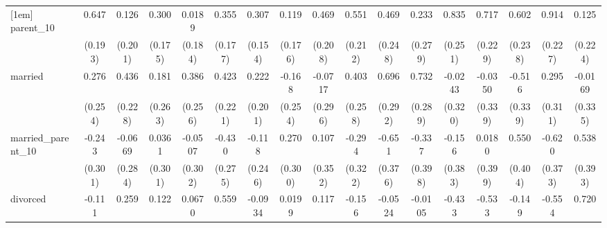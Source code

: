 {\begin{tabular}{l*{16}{c}}
[1em]
parent\_10           &       0.647\sym{***}&       0.126         &       0.300         &      0.0189         &       0.355\sym{*}  &       0.307\sym{*}  &       0.119         &       0.469\sym{*}  &       0.551\sym{**} &       0.469         &       0.233         &       0.835\sym{***}&       0.717\sym{**} &       0.602\sym{*}  &       0.914\sym{***}&       0.125         \\
                    &     (0.193)         &     (0.201)         &     (0.175)         &     (0.184)         &     (0.177)         &     (0.154)         &     (0.176)         &     (0.208)         &     (0.212)         &     (0.248)         &     (0.279)         &     (0.251)         &     (0.229)         &     (0.238)         &     (0.227)         &     (0.224)         \\
[1em]
married             &       0.276         &       0.436         &       0.181         &       0.386         &       0.423         &       0.222         &      -0.168         &     -0.0717         &       0.403         &       0.696\sym{*}  &       0.732\sym{*}  &     -0.0243         &     -0.0350         &      -0.516         &       0.295         &     -0.0169         \\
                    &     (0.254)         &     (0.228)         &     (0.263)         &     (0.256)         &     (0.221)         &     (0.201)         &     (0.254)         &     (0.296)         &     (0.258)         &     (0.292)         &     (0.289)         &     (0.320)         &     (0.339)         &     (0.339)         &     (0.311)         &     (0.335)         \\
[1em]
married\_parent\_10   &      -0.243         &     -0.0669         &      0.0361         &     -0.0507         &      -0.430         &      -0.118         &       0.270         &       0.107         &      -0.294         &      -0.651         &      -0.337         &      -0.156         &      0.0180         &       0.550         &      -0.620         &       0.538         \\
                    &     (0.301)         &     (0.284)         &     (0.301)         &     (0.302)         &     (0.275)         &     (0.246)         &     (0.300)         &     (0.352)         &     (0.322)         &     (0.376)         &     (0.398)         &     (0.383)         &     (0.399)         &     (0.404)         &     (0.373)         &     (0.393)         \\
[1em]
divorced            &      -0.111         &       0.259         &       0.122         &      0.0670         &       0.559\sym{*}  &     -0.0934         &      0.0199         &       0.117         &      -0.156         &     -0.0524         &     -0.0105         &      -0.433         &      -0.533         &      -0.149         &      -0.554         &       0.720\sym{*}  \\

\end{tabular}}
